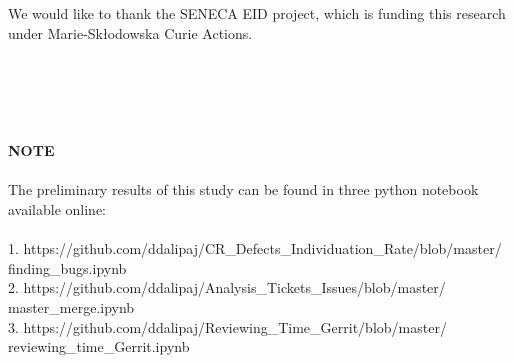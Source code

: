 \documentclass[ifip]{svmult}
\begin{document}
We would like to thank the SENECA EID project, which is funding this research under Marie-Skłodowska Curie Actions.
\\
\\
\\
\\
\\
\\
\textbf{NOTE} 
\\
\\
The preliminary results of this study can be found in three python notebook available online:
\\
\\
1. https://github.com/ddalipaj/CR\_Defects\_Individuation\_Rate/blob/master/
\\
finding\_bugs.ipynb
\\
2. https://github.com/ddalipaj/Analysis\_Tickets\_Issues/blob/master/
\\
master\_merge.ipynb
\\
3. https://github.com/ddalipaj/Reviewing\_Time\_Gerrit/blob/master/
\\
reviewing\_time\_Gerrit.ipynb
\\
\pagebreak

















\end{document}
